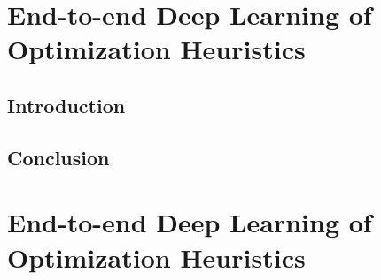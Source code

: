 \ifstapled
\chapter{End-to-end Deep Learning of Optimization Heuristics}
\section{Introduction}
\lipsum[1-2]

\section{Conclusion}
\lipsum[1-2]
\else
\chapter{End-to-end Deep Learning of Optimization Heuristics}
\label{chap:deeptune}






\fi
